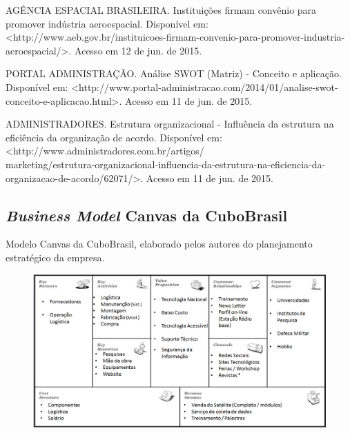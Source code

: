 \documentclass[
	12pt,				%
	openright,			%
	oneside,			%
	a4paper,			%
	english,			%
	french,				%
	spanish,			%
	brazil				%
	]{abntex2}
\begin{document}
	AGÊNCIA ESPACIAL BRASILEIRA. Instituições firmam convênio para promover indústria aeroespacial. Disponível em: <http://www.aeb.gov.br/instituicoes-firmam-convenio-para-promover-industria-aeroespacial/>. Acesso em 12 de jun. de 2015.
	
	PORTAL ADMINISTRAÇÃO. Análise SWOT (Matriz) - Conceito e aplicação. Disponível em: <http://www.portal-administracao.com/2014/01/analise-swot-conceito-e-aplicacao.html>. Acesso em 11 de jun. de 2015.

	ADMINISTRADORES. Estrutura organizacional - Influência da estrutura na eficiência da organização de acordo. Disponível em: <http://www.administradores.com.br/artigos/\\marketing/estrutura-organizacional-influencia-da-estrutura-na-eficiencia-da-organizacao-de-acordo/62071/>. Acesso em 11 de jun. de 2015.


\begin{anexosenv}

\partanexos

\chapter{\textit{Business Model} Canvas da CuboBrasil}
	Modelo Canvas da CuboBrasil, elaborado pelos autores do planejamento estratégico da empresa.
	
	\begin{figure}[th]
		\centering
		\includegraphics[width=1.0\linewidth]{./figs/Anexo_01}
	\end{figure}

\end{anexosenv}
\end{document}

